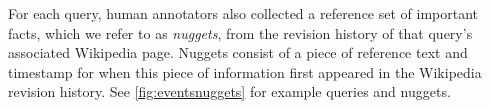 
For each query, human annotators also collected a reference set of important 
facts, which we refer to as \textit{nuggets}, 
from the revision history of that query's associated Wikipedia page. 
Nuggets consist of a piece of reference text and timestamp for when this piece
of information first appeared in the Wikipedia revision history. 
See \autoref{fig:eventsnuggets} for example queries and nuggets.




